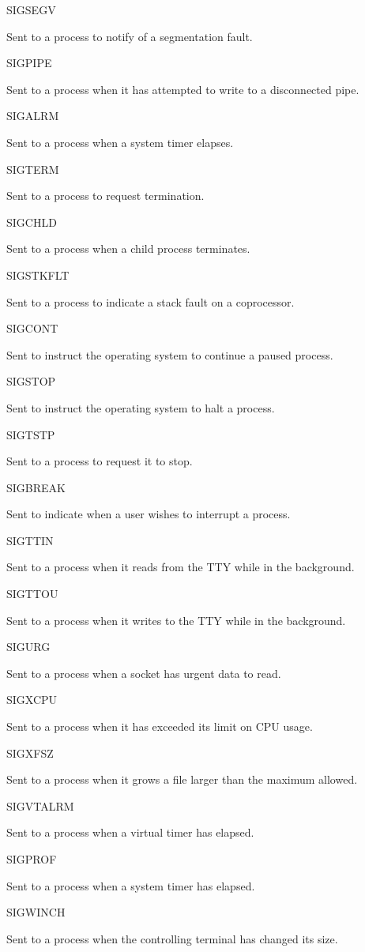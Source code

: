 SIGSEGV

Sent to a process to notify of a segmentation fault.

SIGPIPE

Sent to a process when it has attempted to write to a disconnected pipe.

SIGALRM

Sent to a process when a system timer elapses.

SIGTERM

Sent to a process to request termination.

SIGCHLD

Sent to a process when a child process terminates.

SIGSTKFLT

Sent to a process to indicate a stack fault on a coprocessor.

SIGCONT

Sent to instruct the operating system to continue a paused process.

SIGSTOP

Sent to instruct the operating system to halt a process.

SIGTSTP

Sent to a process to request it to stop.

SIGBREAK

Sent to indicate when a user wishes to interrupt a process.

SIGTTIN

Sent to a process when it reads from the TTY while in the background.

SIGTTOU

Sent to a process when it writes to the TTY while in the background.

SIGURG

Sent to a process when a socket has urgent data to read.

SIGXCPU

Sent to a process when it has exceeded its limit on CPU usage.

SIGXFSZ

Sent to a process when it grows a file larger than the maximum allowed.

SIGVTALRM

Sent to a process when a virtual timer has elapsed.

SIGPROF

Sent to a process when a system timer has elapsed.

SIGWINCH

Sent to a process when the controlling terminal has changed its size.

